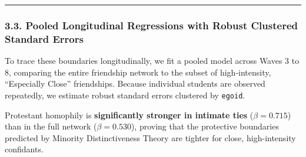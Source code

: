 \documentclass[
  letterpaper,
  DIV=11,
  numbers=noendperiod]{scrartcl}
\begin{document}
\begin{center}\rule{0.5\linewidth}{0.5pt}\end{center}

\subsubsection{3.3. Pooled Longitudinal Regressions with Robust
Clustered Standard
Errors}\label{pooled-longitudinal-regressions-with-robust-clustered-standard-errors}

To trace these boundaries longitudinally, we fit a pooled model across
Waves 3 to 8, comparing the entire friendship network to the subset of
high-intensity, ``Especially Close'' friendships. Because individual
students are observed repeatedly, we estimate robust standard errors
clustered by \texttt{egoid}.

\begin{table}

\caption{\label{tbl-pooled-reg}Pooled Longitudinal Logistic Models
(Waves 3-8, Clustered SEs).}


\end{table}%

Protestant homophily is \textbf{significantly stronger in intimate ties}
(\(\beta = 0.715\)) than in the full network (\(\beta = 0.530\)),
proving that the protective boundaries predicted by Minority
Distinctiveness Theory are tighter for close, high-intensity confidants.
\end{document}
